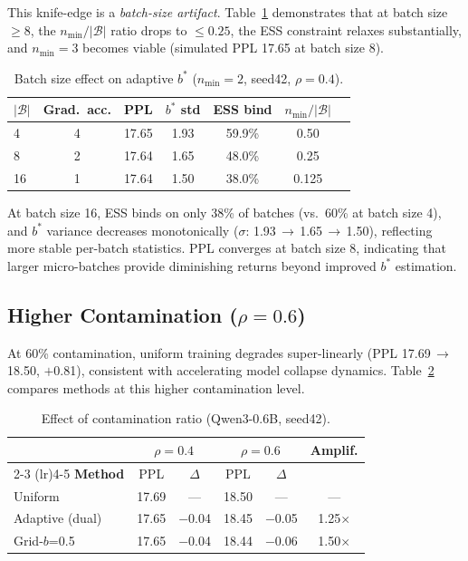 \documentclass[11pt,a4paper]{article}
\newcommand{\bstar}{b^{*}}
\newcommand{\nmin}{n_{\min}}
\begin{document}
This knife-edge is a \emph{batch-size artifact}.
Table~\ref{tab:batchsize} demonstrates that at batch size $\geq 8$, the $\nmin/|\mathcal{B}|$ ratio drops to $\leq 0.25$, the ESS constraint relaxes substantially, and $\nmin=3$ becomes viable (simulated PPL 17.65 at batch size 8).

\begin{table}[t]
\centering
\small
\caption{Batch size effect on adaptive $\bstar$ ($\nmin=2$, seed42, $\rho=0.4$).}
\label{tab:batchsize}
\begin{tabular}{lcccccc}
\toprule
$|\mathcal{B}|$ & Grad.\ acc. & PPL & $\bstar$ std & ESS bind & $\nmin/|\mathcal{B}|$ \\
\midrule
4 & 4 & 17.65 & 1.93 & 59.9\% & 0.50 \\
8 & 2 & 17.64 & 1.65 & 48.0\% & 0.25 \\
16 & 1 & 17.64 & 1.50 & 38.0\% & 0.125 \\
\bottomrule
\end{tabular}
\end{table}

At batch size 16, ESS binds on only 38\% of batches (vs.\ 60\% at batch size 4), and $\bstar$ variance decreases monotonically ($\sigma$: 1.93\,$\to$\,1.65\,$\to$\,1.50), reflecting more stable per-batch statistics.
PPL converges at batch size 8, indicating that larger micro-batches provide diminishing returns beyond improved $\bstar$ estimation.

\subsection{Higher Contamination ($\rho=0.6$)}
\label{sec:rho06}

At 60\% contamination, uniform training degrades super-linearly (PPL 17.69\,$\to$\,18.50, $+$0.81), consistent with accelerating model collapse dynamics.
Table~\ref{tab:rho06} compares methods at this higher contamination level.

\begin{table}[t]
\centering
\small
\caption{Effect of contamination ratio (Qwen3-0.6B, seed42).}
\label{tab:rho06}
\begin{tabular}{lccccc}
\toprule
& \multicolumn{2}{c}{$\rho=0.4$} & \multicolumn{2}{c}{$\rho=0.6$} & \textbf{Amplif.} \\
\cmidrule(lr){2-3} \cmidrule(lr){4-5}
\textbf{Method} & PPL & $\Delta$ & PPL & $\Delta$ & \\
\midrule
Uniform & 17.69 & --- & 18.50 & --- & --- \\
Adaptive (dual) & 17.65 & $-$0.04 & 18.45 & $-$0.05 & 1.25$\times$ \\
Grid-$b$=0.5 & 17.65 & $-$0.04 & 18.44 & $-$0.06 & 1.50$\times$ \\
\bottomrule
\end{tabular}
\end{table}
\end{document}
